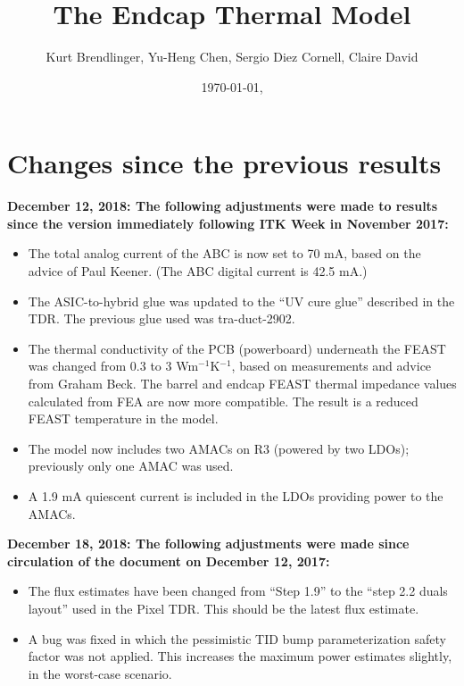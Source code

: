 \documentclass[10pt,]{article}
\title{The Endcap Thermal Model}
\date{\today, \currenttime}
\author{Kurt Brendlinger, Yu-Heng Chen, Sergio Diez Cornell, Claire David}
\begin{document}
\thispagestyle{empty}


\maketitle

\tableofcontents

\section{Changes since the previous results}

{ \bf
December 12, 2018: The following adjustments were made to results since the version immediately
following ITK Week in November 2017:}
\begin{itemize}
\item The total analog current of the ABC is now set to 70 mA, based on the advice of Paul Keener.
(The ABC digital current is 42.5 mA.)
\item The ASIC-to-hybrid glue was updated to the ``UV cure glue'' described in the TDR. The previous
  glue used was tra-duct-2902.
\item The thermal conductivity of the PCB (powerboard) underneath the FEAST was changed from 0.3 to
3 Wm$^{-1}$K$^{-1}$, based on measurements and advice from Graham Beck. The barrel and endcap FEAST
thermal impedance values calculated from FEA are now more compatible. The result is a reduced FEAST
temperature in the model.
\item The model now includes two AMACs on R3 (powered by two LDOs); previously only one AMAC was used.
\item A 1.9 mA quiescent current is included in the LDOs providing power to the AMACs.
\end{itemize}

{\bf 
December 18, 2018: The following adjustments were made since circulation of the document on December 12, 2017:}
\begin{itemize}
\item The flux estimates have been changed from ``Step 1.9'' to the ``step 2.2 duals layout'' used in
the Pixel TDR. This should be the latest flux estimate.
\item A bug was fixed in which the pessimistic TID bump parameterization safety factor was not applied.
This increases the maximum power estimates slightly, in the worst-case scenario.
\end{itemize}
\end{document}
